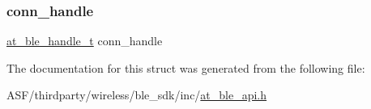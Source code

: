 \subsubsection{\texorpdfstring{conn\_handle}{conn\_handle}}
{\footnotesize\ttfamily \mbox{\hyperlink{at__ble__api_8h_abd23646d0c662860741f787efc8456f2}{at\+\_\+ble\+\_\+handle\+\_\+t}} conn\+\_\+handle}



The documentation for this struct was generated from the following file\+:\begin{DoxyCompactItemize}
\item 
A\+S\+F/thirdparty/wireless/ble\+\_\+sdk/inc/\mbox{\hyperlink{at__ble__api_8h}{at\+\_\+ble\+\_\+api.\+h}}\end{DoxyCompactItemize}
